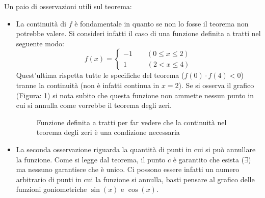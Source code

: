 \thm {
\begin{equation*}
f:[a,b] \to \mathbb{R}\;\; \text{continua, }\; f(a) \cdot f(b) < 0 \implies \exists c \in ]a,b[ : f(c) = 0
\end{equation*}
}
Un paio di osservazioni utili sul teorema:
\begin{itemize}
    \item La continuità di $f$ è fondamentale in quanto se non lo fosse il teorema non potrebbe valere. Si consideri infatti il caso di una funzione definita a tratti nel seguente modo:
    \begin{equation*}
        f(x) =
        \begin{cases*}
            -1 \qquad (0 \leq x \leq 2)\\
            1   \qquad \;\;\;(2 < x \leq 4)
        \end{cases*}
    \end{equation*}
    Quest'ultima rispetta tutte le specifiche del teorema ($f(0) \cdot f(4) < 0$) tranne la continuità (non è infatti continua in $x = 2$). Se si osserva il grafico (Figura: \ref{fig_teoraZeri}) si nota subito che questa funzione non ammette nessun punto in cui si annulla come vorrebbe il teorema degli zeri.

    \begin{figure}[h]
        \centering


	\caption{Funzione definita a tratti per far vedere che la continuità nel teorema degli zeri è una condizione necessaria}
        \label{fig_teoraZeri}
    \end{figure}

    \item La seconda osservazione riguarda la quantità di punti in cui si può annullare la funzione. Come si legge dal teorema, il punto $c$ è garantito che esista ($\exists$) ma nessuno garantisce che è unico. Ci possono essere infatti un numero arbitrario di punti in cui la funzione si annulla, basti pensare al grafico delle funzioni goniometriche $\sin(x)$ e $\cos(x)$.
\end{itemize}


